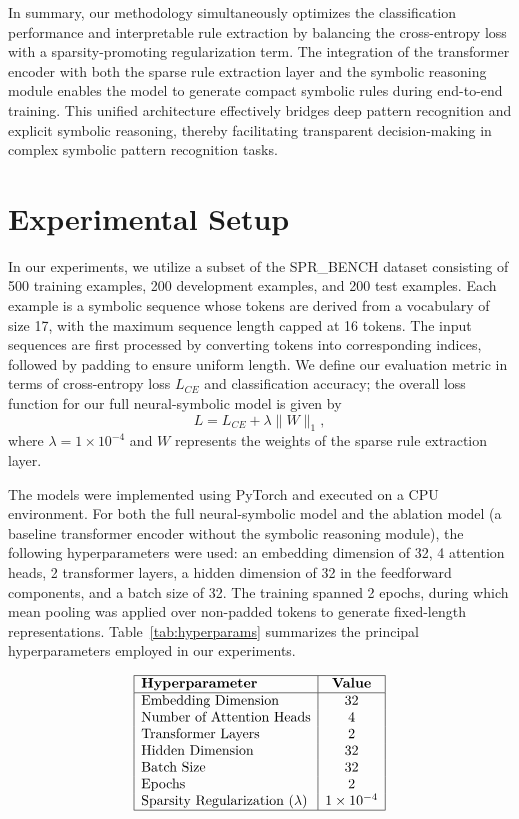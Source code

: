 \documentclass{article}
\begin{document}
In summary, our methodology simultaneously optimizes the classification performance and interpretable rule extraction by balancing the cross-entropy loss with a sparsity-promoting regularization term. The integration of the transformer encoder with both the sparse rule extraction layer and the symbolic reasoning module enables the model to generate compact symbolic rules during end-to-end training. This unified architecture effectively bridges deep pattern recognition and explicit symbolic reasoning, thereby facilitating transparent decision-making in complex symbolic pattern recognition tasks.

\section{Experimental Setup}
In our experiments, we utilize a subset of the SPR\_BENCH dataset consisting of 500 training examples, 200 development examples, and 200 test examples. Each example is a symbolic sequence whose tokens are derived from a vocabulary of size 17, with the maximum sequence length capped at 16 tokens. The input sequences are first processed by converting tokens into corresponding indices, followed by padding to ensure uniform length. We define our evaluation metric in terms of cross-entropy loss \(L_{CE}\) and classification accuracy; the overall loss function for our full neural-symbolic model is given by
\[
L = L_{CE} + \lambda \|W\|_1,
\]
where \(\lambda = 1 \times 10^{-4}\) and \(W\) represents the weights of the sparse rule extraction layer.

The models were implemented using PyTorch and executed on a CPU environment. For both the full neural-symbolic model and the ablation model (a baseline transformer encoder without the symbolic reasoning module), the following hyperparameters were used: an embedding dimension of 32, 4 attention heads, 2 transformer layers, a hidden dimension of 32 in the feedforward components, and a batch size of 32. The training spanned 2 epochs, during which mean pooling was applied over non-padded tokens to generate fixed-length representations. Table~\ref{tab:hyperparams} summarizes the principal hyperparameters employed in our experiments.

\[
\begin{array}{|l|c|}
\hline
\textbf{Hyperparameter} & \textbf{Value} \\
\hline
\text{Embedding Dimension} & 32 \\
\text{Number of Attention Heads} & 4 \\
\text{Transformer Layers} & 2 \\
\text{Hidden Dimension} & 32 \\
\text{Batch Size} & 32 \\
\text{Epochs} & 2 \\
\text{Sparsity Regularization } (\lambda) & 1 \times 10^{-4} \\
\hline
\end{array}
\]
\end{document}
